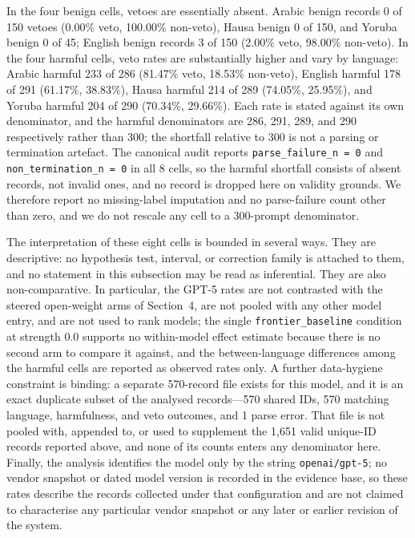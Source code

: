 In the four benign cells, vetoes are essentially absent. Arabic benign records
0 of 150 vetoes (0.00\% veto, 100.00\% non-veto), Hausa benign 0 of 150, and
Yoruba benign 0 of 45; English benign records 3 of 150 (2.00\% veto, 98.00\%
non-veto). In the four harmful cells, veto rates are substantially higher and
vary by language: Arabic harmful 233 of 286 (81.47\% veto, 18.53\% non-veto),
English harmful 178 of 291 (61.17\%, 38.83\%), Hausa harmful 214 of 289
(74.05\%, 25.95\%), and Yoruba harmful 204 of 290 (70.34\%, 29.66\%). Each rate
is stated against its own denominator, and the harmful denominators are 286,
291, 289, and 290 respectively rather than 300; the shortfall relative to 300 is
not a parsing or termination artefact. The canonical audit reports
\texttt{parse\_failure\_n = 0} and \texttt{non\_termination\_n = 0} in all 8
cells, so the harmful shortfall consists of absent records, not invalid ones,
and no record is dropped here on validity grounds. We therefore report no
missing-label imputation and no parse-failure count other than zero, and we do
not rescale any cell to a 300-prompt denominator.

The interpretation of these eight cells is bounded in several ways. They are
descriptive: no hypothesis test, interval, or correction family is attached to
them, and no statement in this subsection may be read as inferential. They are
also non-comparative. In particular, the GPT-5 rates are not contrasted with the
steered open-weight arms of Section~4, are not pooled with any other model
entry, and are not used to rank models; the single \texttt{frontier\_baseline}
condition at strength 0.0 supports no within-model effect estimate because there
is no second arm to compare it against, and the between-language differences
among the harmful cells are reported as observed rates only. A further data-hygiene
constraint is binding: a separate 570-record file exists for this model, and it
is an exact duplicate subset of the analysed records---570 shared IDs, 570
matching language, harmfulness, and veto outcomes, and 1 parse error. That file
is not pooled with, appended to, or used to supplement the 1{,}651 valid
unique-ID records reported above, and none of its counts enters any denominator
here. Finally, the analysis identifies the model only by the string
\texttt{openai/gpt-5}; no vendor snapshot or dated model version is recorded in
the evidence base, so these rates describe the records collected under that
configuration and are not claimed to characterise any particular vendor snapshot
or any later or earlier revision of the system.

